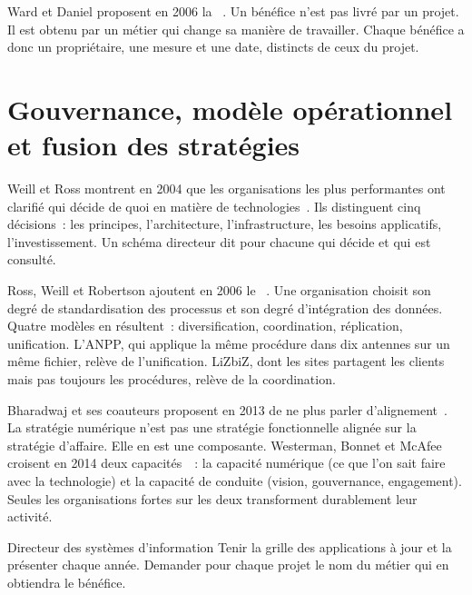 Ward et Daniel proposent en 2006 la ~\cite{warddaniel2006}. Un bénéfice n'est pas
livré par un projet. Il est obtenu par un métier qui change sa manière de travailler. Chaque bénéfice a donc un
propriétaire, une mesure et une date, distincts de ceux du projet.

\section{Gouvernance, modèle opérationnel et fusion des stratégies}
\label{sec:c03-gouvernance}

Weill et Ross montrent en 2004 que les organisations les plus performantes ont clarifié qui décide de quoi en
matière de technologies~\cite{weillross2004}. Ils distinguent cinq décisions~: les principes, l'architecture,
l'infrastructure, les besoins applicatifs, l'investissement. Un schéma directeur dit pour chacune qui décide et
qui est consulté.

Ross, Weill et Robertson ajoutent en 2006 le ~\cite{ross2006}. Une organisation
choisit son degré de standardisation des processus et son degré d'intégration des données. Quatre modèles en
résultent~: diversification, coordination, réplication, unification. L'ANPP, qui applique la même procédure
dans dix antennes sur un même fichier, relève de l'unification. LiZbiZ, dont les sites partagent les clients
mais pas toujours les procédures, relève de la coordination.

Bharadwaj et ses coauteurs proposent en 2013 de ne plus parler d'alignement~\cite{bharadwaj2013}. La stratégie
numérique n'est pas une stratégie fonctionnelle alignée sur la stratégie d'affaire. Elle en est une composante.
Westerman, Bonnet et McAfee croisent en 2014 deux capacités~\cite{westerman2014}~: la capacité numérique (ce que
l'on sait faire avec la technologie) et la capacité de conduite (vision, gouvernance, engagement). Seules les
organisations fortes sur les deux transforment durablement leur activité.

\begin{boxmetier}{Directeur des systèmes d'information}
Tenir la grille des applications à jour et la présenter chaque année. Demander pour chaque projet le nom du métier qui en obtiendra le bénéfice.
\end{boxmetier}

